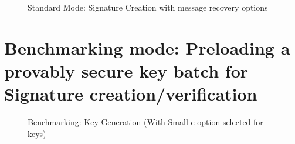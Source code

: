 \documentclass[]{final_report}
\begin{document}
\begin{figure}[H]
\begin{minipage}{0.49\textwidth}
       \caption{Standard Mode: Signature Creation with message recovery options}
        \label{fig:image2}
    \end{minipage}
\end{figure}


\section{Benchmarking mode: Preloading a provably secure key batch for Signature creation/verification}

\begin{figure}[H]
    \centering %
    
    \begin{minipage}{0.49\textwidth}
        \centering
       \caption{Benchmarking: Key Generation (With Small e option selected for keys)}
        \label{fig:pre1}
    \end{minipage}
    \hfill %
    \begin{minipage}{0.49\textwidth}
        \centering

\end{minipage}
\end{figure}
\end{document}
